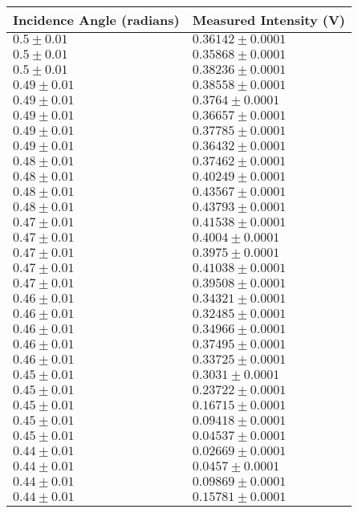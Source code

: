 \begin{tabular}{| p{} | p{} |}
\hline
Incidence Angle (radians) & Measured Intensity (V)\\
\hline
$0.5 \pm 0.01$ & $0.36142 \pm 0.0001$\\
$0.5 \pm 0.01$ & $0.35868 \pm 0.0001$\\
$0.5 \pm 0.01$ & $0.38236 \pm 0.0001$\\
$0.49 \pm 0.01$ & $0.38558 \pm 0.0001$\\
$0.49 \pm 0.01$ & $0.3764 \pm 0.0001$\\
$0.49 \pm 0.01$ & $0.36657 \pm 0.0001$\\
$0.49 \pm 0.01$ & $0.37785 \pm 0.0001$\\
$0.49 \pm 0.01$ & $0.36432 \pm 0.0001$\\
$0.48 \pm 0.01$ & $0.37462 \pm 0.0001$\\
$0.48 \pm 0.01$ & $0.40249 \pm 0.0001$\\
$0.48 \pm 0.01$ & $0.43567 \pm 0.0001$\\
$0.48 \pm 0.01$ & $0.43793 \pm 0.0001$\\
$0.47 \pm 0.01$ & $0.41538 \pm 0.0001$\\
$0.47 \pm 0.01$ & $0.4004 \pm 0.0001$\\
$0.47 \pm 0.01$ & $0.3975 \pm 0.0001$\\
$0.47 \pm 0.01$ & $0.41038 \pm 0.0001$\\
$0.47 \pm 0.01$ & $0.39508 \pm 0.0001$\\
$0.46 \pm 0.01$ & $0.34321 \pm 0.0001$\\
$0.46 \pm 0.01$ & $0.32485 \pm 0.0001$\\
$0.46 \pm 0.01$ & $0.34966 \pm 0.0001$\\
$0.46 \pm 0.01$ & $0.37495 \pm 0.0001$\\
$0.46 \pm 0.01$ & $0.33725 \pm 0.0001$\\
$0.45 \pm 0.01$ & $0.3031 \pm 0.0001$\\
$0.45 \pm 0.01$ & $0.23722 \pm 0.0001$\\
$0.45 \pm 0.01$ & $0.16715 \pm 0.0001$\\
$0.45 \pm 0.01$ & $0.09418 \pm 0.0001$\\
$0.45 \pm 0.01$ & $0.04537 \pm 0.0001$\\
$0.44 \pm 0.01$ & $0.02669 \pm 0.0001$\\
$0.44 \pm 0.01$ & $0.0457 \pm 0.0001$\\
$0.44 \pm 0.01$ & $0.09869 \pm 0.0001$\\
$0.44 \pm 0.01$ & $0.15781 \pm 0.0001$\\
\hline
\end{tabular}\hfill
